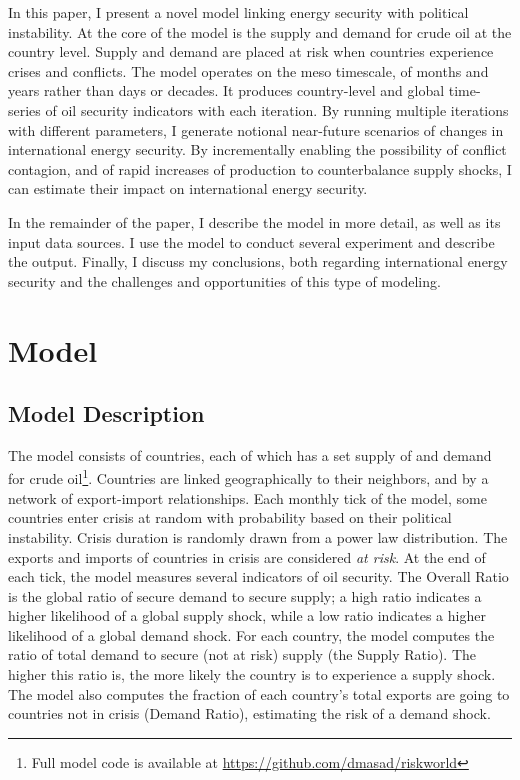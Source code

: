 \documentclass{llncs}
\begin{document}
In this paper, I present a novel model linking energy security with political instability. At the core of the model is the supply and demand for crude oil at the country level. Supply and demand are placed at risk when countries experience crises and conflicts. The model operates on the meso timescale, of months and years rather than days or decades.  It produces country-level and global time-series of oil security indicators with each iteration. By running multiple iterations with different parameters, I generate notional near-future scenarios of changes in international energy security. By incrementally enabling the possibility of conflict contagion, and of rapid increases of production to counterbalance supply shocks, I can estimate their impact on international energy security. 

In the remainder of the paper, I describe the model in more detail, as well as its input data sources. I use the model to conduct several experiment and describe the output. Finally, I discuss my conclusions, both regarding international energy security and the challenges and opportunities of this type of modeling.

\section{Model}

\subsection{Model Description}

The model consists of countries, each of which has a set supply of and demand for crude oil\footnote{Full model code is available at \url{https://github.com/dmasad/riskworld}}. Countries are linked geographically to their neighbors, and by a network of export-import relationships. Each monthly tick of the model, some countries enter crisis at random with probability based on their political instability. Crisis duration is randomly drawn from a power law distribution. The exports and imports of countries in crisis are considered \emph{at risk}. At the end of each tick, the model measures several indicators of oil security. The Overall Ratio is the global ratio of secure demand to secure supply; a high ratio indicates a higher likelihood of a global supply shock, while a low ratio indicates a higher likelihood of a global demand shock. For each country, the model computes the ratio of total demand to secure (not at risk) supply (the Supply Ratio). The higher this ratio is, the more likely the country is to experience a supply shock. The model also computes the fraction of each country's total exports are going to countries not in crisis (Demand Ratio), estimating the risk of a demand shock.
\end{document}
